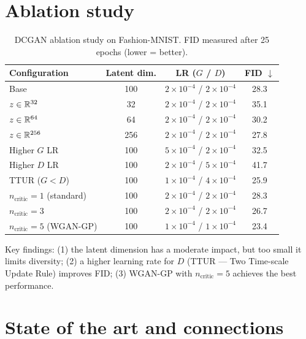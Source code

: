 \section{Ablation study}
\label{sec:gan-ablation}

\begin{table}[htbp]
\centering
\caption{DCGAN ablation study on Fashion-MNIST. FID measured after 25 epochs (lower = better).}
\label{tab:gan-ablation}
\begin{tabular}{lccc}
\toprule
\textbf{Configuration} & \textbf{Latent dim.} & \textbf{LR ($G$ / $D$)} & \textbf{FID} $\downarrow$ \\
\midrule
Base & 100 & $2\!\times\!10^{-4}$ / $2\!\times\!10^{-4}$ & 28.3 \\
\midrule
$z \in \mathbb{R}^{32}$ & 32 & $2\!\times\!10^{-4}$ / $2\!\times\!10^{-4}$ & 35.1 \\
$z \in \mathbb{R}^{64}$ & 64 & $2\!\times\!10^{-4}$ / $2\!\times\!10^{-4}$ & 30.2 \\
$z \in \mathbb{R}^{256}$ & 256 & $2\!\times\!10^{-4}$ / $2\!\times\!10^{-4}$ & 27.8 \\
\midrule
Higher $G$ LR & 100 & $5\!\times\!10^{-4}$ / $2\!\times\!10^{-4}$ & 32.5 \\
Higher $D$ LR & 100 & $2\!\times\!10^{-4}$ / $5\!\times\!10^{-4}$ & 41.7 \\
TTUR ($G < D$) & 100 & $1\!\times\!10^{-4}$ / $4\!\times\!10^{-4}$ & 25.9 \\
\midrule
$n_{\text{critic}}=1$ (standard) & 100 & $2\!\times\!10^{-4}$ / $2\!\times\!10^{-4}$ & 28.3 \\
$n_{\text{critic}}=3$ & 100 & $2\!\times\!10^{-4}$ / $2\!\times\!10^{-4}$ & 26.7 \\
$n_{\text{critic}}=5$ (WGAN-GP) & 100 & $1\!\times\!10^{-4}$ / $1\!\times\!10^{-4}$ & 23.4 \\
\bottomrule
\end{tabular}
\end{table}

\begin{remark}
Key findings: (1) the latent dimension has a moderate impact, but too small it limits diversity; (2) a higher learning rate for $D$ (TTUR --- Two Time-scale Update Rule) improves FID; (3) WGAN-GP with $n_{\text{critic}}=5$ achieves the best performance.
\end{remark}

\section{State of the art and connections}
\label{sec:gan-sota}

